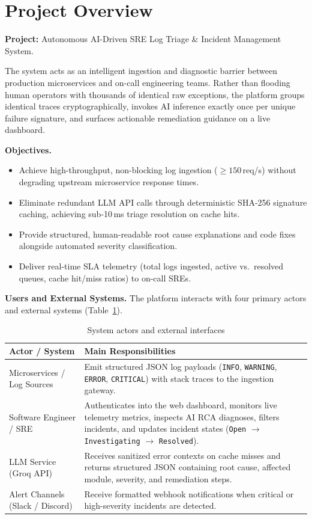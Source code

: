 \documentclass[12pt,a4paper,oneside]{report}
\begin{document}
\section{Project Overview}
\textbf{Project:} Autonomous AI-Driven SRE Log Triage \& Incident Management System.

The system acts as an intelligent ingestion and diagnostic barrier between production microservices and on-call engineering teams. Rather than flooding human operators with thousands of identical raw exceptions, the platform groups identical traces cryptographically, invokes AI inference exactly once per unique failure signature, and surfaces actionable remediation guidance on a live dashboard.

\textbf{Objectives.}
\begin{itemize}
  \item Achieve high-throughput, non-blocking log ingestion ($\ge 150$\,req/s) without degrading upstream microservice response times.
  \item Eliminate redundant LLM API calls through deterministic SHA-256 signature caching, achieving sub-10\,ms triage resolution on cache hits.
  \item Provide structured, human-readable root cause explanations and code fixes alongside automated severity classification.
  \item Deliver real-time SLA telemetry (total logs ingested, active vs.\ resolved queues, cache hit/miss ratios) to on-call SREs.
\end{itemize}

\textbf{Users and External Systems.} The platform interacts with four primary actors and external systems (Table~\ref{tab:roles}).

\begin{table}[H]
\centering\small\singlespacing
\caption{System actors and external interfaces}\label{tab:roles}
\begin{tabularx}{\linewidth}{@{}l X@{}}
\toprule
\textbf{Actor / System} & \textbf{Main Responsibilities}\\
\midrule
Microservices / Log Sources & Emit structured JSON log payloads (\texttt{INFO}, \texttt{WARNING}, \texttt{ERROR}, \texttt{CRITICAL}) with stack traces to the ingestion gateway.\\
Software Engineer / SRE & Authenticates into the web dashboard, monitors live telemetry metrics, inspects AI RCA diagnoses, filters incidents, and updates incident states (\texttt{Open} $\rightarrow$ \texttt{Investigating} $\rightarrow$ \texttt{Resolved}).\\
LLM Service (Groq API) & Receives sanitized error contexts on cache misses and returns structured JSON containing root cause, affected module, severity, and remediation steps.\\
Alert Channels (Slack / Discord) & Receive formatted webhook notifications when critical or high-severity incidents are detected.\\
\bottomrule
\end{tabularx}
\end{table}
\end{document}
